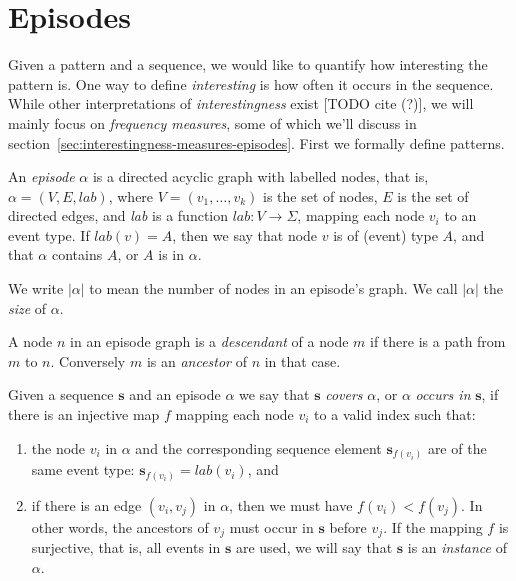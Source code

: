 \section{Episodes}

Given a pattern and a sequence, we would like to quantify how interesting the pattern is. One way to define \emph{interesting} is how often it occurs in the sequence. While other interpretations of \emph{interestingness} exist [TODO cite (?)], we will mainly focus on \emph{frequency measures}, some of which we'll discuss in section~\ref{sec:interestingness-measures-episodes}. First we formally define patterns.


\begin{definition}
An \emph{episode} $ \alpha $ is a directed acyclic graph with labelled nodes, that is, $ \alpha = (V, E, lab) $, where $ V = (v_1, \ldots, v_k) $ is the set of nodes, $ E $ is the set of directed edges, and \emph{lab} is a function $ lab \colon V \rightarrow \Sigma $, mapping each node $ v_i $ to an event type. If $ lab(v) = A $, then we say that node $ v $ is of (event) type $ A $, and that $ \alpha $ contains $ A $, or $ A $ is in $ \alpha $.
\end{definition}

We write $ | \alpha | $ to mean the number of nodes in an episode's graph. We call $ | \alpha | $ the \emph{size} of $ \alpha $.

\begin{definition}
A node $ n $ in an episode graph is a \emph{descendant} of a node $ m $ if there is a path from $ m $ to $ n $. Conversely $ m $ is an \emph{ancestor} of $ n $ in that case.
\end{definition}

\begin{definition}
Given a sequence $ \boldsymbol{s} $ and an episode $ \alpha $ we say that $ \boldsymbol{s} $ \emph{covers} $ \alpha $, or $ \alpha $ \emph{occurs in} $ \boldsymbol{s} $, if there is an injective map $ f $ mapping each node $ v_i $ to a valid index such that:
\begin{enumerate}
\item the node $ v_i $ in $ \alpha $ and the corresponding sequence element $ \boldsymbol{s}_{f(v_i)} $ are of the same event type: $ \boldsymbol{s}_{f(v_i)} = lab(v_i) $, and
\item if there is an edge $ (v_i, v_j) $ in $ \alpha $, then we must have $ f(v_i) < f(v_j) $. In other words, the ancestors of $ v_j $ must occur in $ \boldsymbol{s} $ before $ v_j $. If the mapping $ f $ is surjective, that is, all events in $ \boldsymbol{s} $ are used, we will say that $ \boldsymbol{s} $ is an \emph{instance} of $ \alpha $.
\end{enumerate}
\end{definition}

